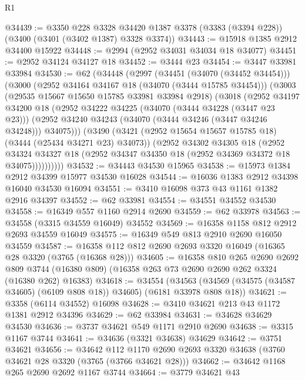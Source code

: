 \begin{lexlean}{R1}
\begin{coremodule}
@34439 := @3350
    @228
    @3328
    @34420
    @1387
    @3378
    (@3383 (@3394 @228))
    (@3400 (@3401 (@3402 @1387) @3328 @3374))
@34443 := @15918 @1385 @2912 @34400 @15922
@34448 := @2994 (@2952 @34031 @34034 @18 @34077)
@34451 := @2952 @34124 @34127 @18
@34452 := @3444 @23
@34454 := @3447 @33981 @33984
@34530 := @62
    (@34448
      (@2997
        (@34451 (@34070 (@34452 @34454)))
        (@3000
          (@2952 @34164 @34167 @18 (@34070 (@3444 @15785 @34454)))
          (@3003
            (@29535 @15667 @15650 @15785 @33981 @33984 @2918)
            (@3018
              (@2952
                @34197
                @34200
                @18
                (@2952
                  @34222
                  @34225
                  (@34070 (@3444 @34228 (@3447 @23 @23)))
                  (@2952 @34240 @34243 (@34070 (@3444 @34246 (@3447 @34246 @34248))) @34075)))
              (@3490
                (@3421 (@2952 @15654 @15657 @15785 @18) (@3444 (@25434 @34271 @23) @34073))
                (@2952
                  @34302
                  @34305
                  @18
                  (@2952
                    @34324
                    @34327
                    @18
                    (@2952 @34347 @34350 @18 (@2952 @34369 @34372 @18 @34075))))))))))
@34532 := @34443 @34530 @15965
@34538 := @15973 @1384 @2912 @34399 @15977 @34530 @16028
@34544 := @16036 @1383 @2912 @34398 @16040 @34530 @16094
@34551 := @3410 @16098 @373 @43 @1161 @1382 @2916 @34397
@34552 := @62 @33981
@34554 := @34551 @34552 @34530
@34558 := @16349 @557 @1160 @2914 @2690
@34559 := @62 @33978
@34563 := @34558 (@3315 @34559 @16049) @34552
@34569 := @16358 @1158 @812 @2912 @2693 @34559 @16049
@34575 := @16349 @549 @813 @2910 @2690 @16050 @34559
@34587 := @16358 @112 @812 @2690 @2693 @3320 @16049 (@16365 @28 @3320 (@3765 (@16368 @28)))
@34605 := @16358
    @810
    @265
    @2690
    @2692
    @809
    @3744
    (@16380 @809)
    (@16358 @263 @73 @2690 @2690 @262 @3324 (@16380 @262) @16383)
@34618 := @34554
    (@34563 (@34569 (@34575 (@34587 @34605) (@6109 @808 @18)) @34605) (@6181 @33978 @808 @18))
@34621 := @3358 (@6114 @34552) @16098
@34628 := @3410 @34621 @213 @43 @1172 @1381 @2912 @34396
@34629 := @62 @33984
@34631 := @34628 @34629 @34530
@34636 := @3737 @34621 @549 @1171 @2910 @2690
@34638 := @3315 @1167 @3744
@34641 := @34636 (@3321 @34638) @34629
@34642 := @3751 @34621
@34656 := @34642
    @112
    @1170
    @2690
    @2693
    @3320
    @34638
    (@3760 @34621 @28 @3320 (@3765 (@3766 @34621 @28)))
@34662 := @34642 @1168 @265 @2690 @2692 @1167 @3744
@34664 := @3779 @34621 @43

\end{coremodule}
\end{lexlean}
